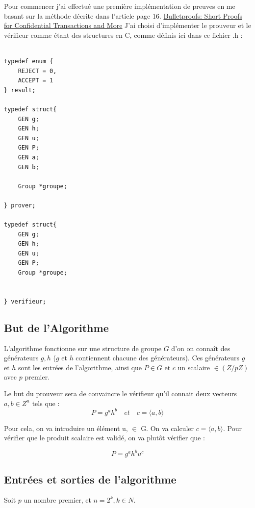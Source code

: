 \documentclass[a4paper]{article}
\theoremstyle{theorem}
\theoremstyle{definition}
\begin{document}
Pour commencer j'ai effectué une première implémentation de preuves en me basant sur la méthode décrite dans l'article page 16.
\href{https://www.google.com/url?sa=t&rct=j&q=&esrc=s&source=web&cd=&cad=rja&uact=8&ved=2ahUKEwjUgo7fqsOLAxWkfKQEHaJBHLMQFnoECBYQAQ&url=https%3A%2F%2Feprint.iacr.org%2F2017%2F1066.pdf&usg=AOvVaw3hDT__ZU-Hu_KgOIIbMhYM&opi=89978449}{ Bulletproofs: Short Proofs for Confidential Transactions and More}
\vspace{0.5cm}
J'ai choisi d'implémenter le prouveur et le vérifieur comme étant des structures en C, comme définis ici dans ce fichier .h : 
\begin{lstlisting}

typedef enum {
    REJECT = 0,
    ACCEPT = 1
} result;

typedef struct{
    GEN g;
    GEN h;
    GEN u;
    GEN P;
    GEN a;
    GEN b;

    Group *groupe;

} prover;

typedef struct{
    GEN g;
    GEN h;
    GEN u;
    GEN P;
    Group *groupe;


} verifieur;

\end{lstlisting} 

\subsection{But de l'Algorithme}
L'algorithme fonctionne sur une structure de groupe $G$ d'on  on connaît des générateurs  $g,h$ ($g$ et $h$ contiennent chacune des générateurs). Ces générateurs $g$ et $h$ sont les entrées de l'algorithme, ainsi que $P \in G$ et $c$ un scalaire $\in (Z/pZ)$ avec $p$ premier.

\vspace{0.5cm}
Le but du prouveur sera de convaincre le vérifieur qu'il connait deux vecteurs $a,b \in Z^{n}$ tels que : 
\label{key}\[P = g^a h^b    \quad et \quad c=⟨a,b⟩\]


Pour cela, on va introduire  un élément u, $\in$ G. On va calculer $c=⟨a,b⟩$. Pour vérifier que le produit scalaire est validé, on va plutôt vérifier que :

\[ P =g^a h^b u^c \]

\subsection{Entrées et sorties de l'algorithme}

Soit $p$ un nombre premier, et $n = 2^k, k \in N$.
\end{document}
